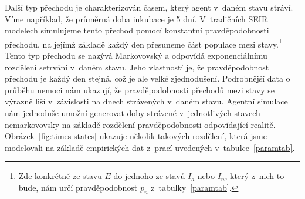 Další typ přechodu je charakterizován časem, který agent v~daném stavu stráví. Víme například, že průměrná doba inkubace je 5 dní. V~tradičních SEIR modelech simulujeme tento přechod pomocí konstantní pravděpodobnosti přechodu, na jejímž základě každý den přesuneme část populace mezi stavy.\footnote{Zde konkrétně ze stavu $E$ do jednoho ze stavů $I_a$ nebo $I_n$, který z~nich to bude, nám určí pravděpodobnost $p_n$ z~tabulky~\ref{paramtab}.} Tento typ přechodu se nazývá Markovovský a odpovídá exponenciálnímu rozdělení setrvání v~daném stavu. Jeho vlastností je, že pravděpodobnost přechodu je každý den stejná, což je ale velké zjednodušení. Podrobnější data o průběhu nemoci nám ukazují, že pravděpodobnosti přechodů mezi stavy se výrazně liší v~závislosti na dnech strávených v~daném stavu. Agentní simulace nám jednoduše umožní generovat doby strávené v~jednotlivých stavech nemarkovovsky na základě rozdělení pravděpodobnosti odpovídající realitě. Obrázek~\ref{fig:times-states} ukazuje několik takových rozdělení, která jsme modelovali na základě empirických dat z~prací uvedených v~tabulce~\ref{paramtab}.   


